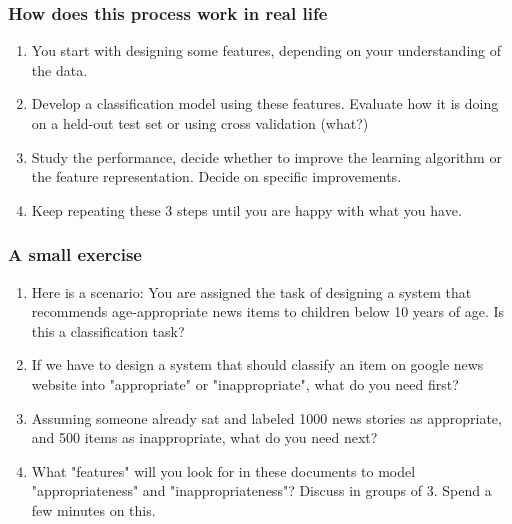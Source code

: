 \documentclass{beamer}
\begin{document}
\begin{frame}
\frametitle{How does this process work in real life}
\begin{enumerate}
\item You start with designing some features, depending on your understanding of the data.
\item Develop a classification model using these features. Evaluate how it is doing on a held-out test set or using cross validation (what?) \pause
\item Study the performance, decide whether to improve the learning algorithm or the feature representation. Decide on specific improvements.
\item Keep repeating these 3 steps until you are happy with what you have.
\end{enumerate}
\end{frame}

\begin{frame}
\frametitle{A small exercise}
\begin{enumerate}
\item Here is a scenario: You are assigned the task of designing a system that recommends age-appropriate news items to children below 10 years of age. Is this a classification task? \pause
\item If we have to design a system that should classify an item on google news website into "appropriate" or "inappropriate", what do you need first? \pause
\item Assuming someone already sat and labeled 1000 news stories as appropriate, and 500 items as inappropriate, what do you need next? \pause
\item What "features" will you look for in these documents to model "appropriateness" and "inappropriateness"? Discuss in groups of 3. Spend a few minutes on this.
\end{enumerate}
\end{frame}
\end{document}
